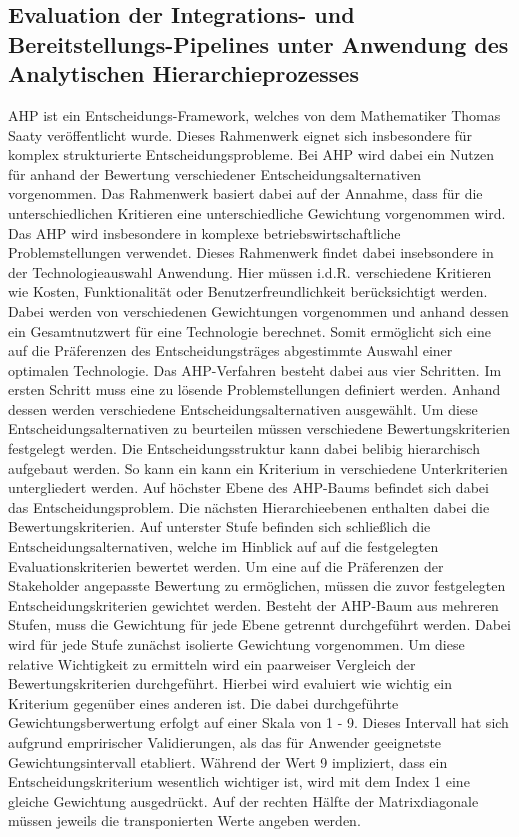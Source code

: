 \subsection{Evaluation der Integrations- und Bereitstellungs-Pipelines unter Anwendung des Analytischen Hierarchieprozesses}
AHP ist ein Entscheidungs-Framework, welches von dem Mathematiker Thomas Saaty veröffentlicht wurde. Dieses Rahmenwerk eignet sich insbesondere für komplex strukturierte Entscheidungsprobleme. Bei AHP wird dabei ein Nutzen für anhand der Bewertung verschiedener Entscheidungsalternativen vorgenommen. Das Rahmenwerk basiert dabei auf der Annahme, dass für die unterschiedlichen Kritieren eine unterschiedliche Gewichtung vorgenommen wird. Das AHP wird insbesondere in komplexe betriebswirtschaftliche Problemstellungen verwendet. Dieses Rahmenwerk findet dabei insebsondere in der Technologieauswahl Anwendung. Hier müssen i.d.R. verschiedene Kritieren wie Kosten, Funktionalität oder Benutzerfreundlichkeit berücksichtigt werden. Dabei werden von verschiedenen Gewichtungen vorgenommen und anhand dessen ein Gesamtnutzwert für eine Technologie berechnet. Somit ermöglicht sich eine auf die Präferenzen des Entscheidungsträges abgestimmte Auswahl einer optimalen Technologie. Das AHP-Verfahren besteht dabei aus vier Schritten. Im ersten Schritt muss eine zu lösende Problemstellungen definiert werden. Anhand dessen werden verschiedene Entscheidungsalternativen ausgewählt. Um diese Entscheidungsalternativen zu beurteilen müssen verschiedene Bewertungskriterien festgelegt werden. Die Entscheidungsstruktur kann dabei belibig hierarchisch aufgebaut werden. So kann ein kann ein Kriterium in verschiedene Unterkriterien untergliedert werden. Auf höchster Ebene des AHP-Baums befindet sich dabei das Entscheidungsproblem. Die nächsten Hierarchieebenen enthalten dabei die Bewertungskriterien. Auf unterster Stufe befinden sich schließlich die Entscheidungsalternativen, welche im Hinblick auf auf die festgelegten Evaluationskriterien bewertet werden. Um eine auf die Präferenzen der Stakeholder angepasste Bewertung zu ermöglichen, müssen die zuvor festgelegten Entscheidungskriterien gewichtet werden. Besteht der AHP-Baum aus mehreren Stufen, muss die Gewichtung für jede Ebene getrennt durchgeführt werden. Dabei wird für jede Stufe zunächst isolierte Gewichtung vorgenommen. Um diese relative Wichtigkeit zu ermitteln wird ein paarweiser Vergleich der Bewertungskriterien durchgeführt. Hierbei wird evaluiert wie wichtig ein Kriterium gegenüber eines anderen ist. Die dabei durchgeführte Gewichtungsberwertung erfolgt auf einer Skala von 1 - 9. Dieses Intervall hat sich aufgrund empririscher Validierungen, als das für Anwender geeignetste Gewichtungsintervall etabliert. Während der Wert 9 impliziert, dass ein Entscheidungskriterium wesentlich wichtiger ist, wird mit dem Index 1 eine gleiche Gewichtung ausgedrückt. Auf der rechten Hälfte der Matrixdiagonale müssen jeweils die transponierten Werte angeben werden. 
